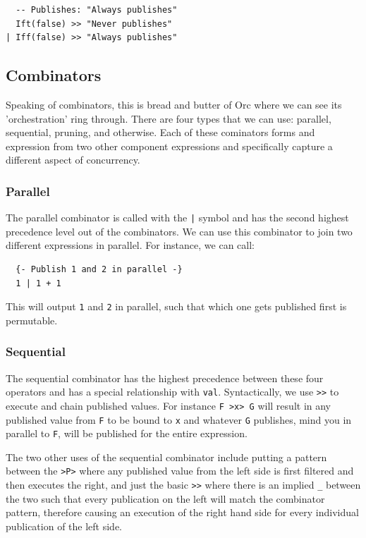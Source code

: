 \documentclass[12pt, letterpaper]{article}
\begin{document}
\begin{lstlisting}
  -- Publishes: "Always publishes"
  Ift(false) >> "Never publishes"
| Iff(false) >> "Always publishes"
\end{lstlisting}

\subsection{Combinators}

Speaking of combinators, this is bread and butter of Orc where we can see its 'orchestration' ring through.  There are four types that we can use: parallel, sequential, pruning, and otherwise.  Each of these cominators forms and expression from two other component expressions and specifically capture a different aspect of concurrency\cite{UserGuide}.

\subsubsection{Parallel}

The parallel combinator is called with the \texttt{|} symbol and has the second highest precedence level out of the combinators.  We can use this combinator to join two different expressions in parallel.  For instance, we can call:

\begin{lstlisting}
  {- Publish 1 and 2 in parallel -}
  1 | 1 + 1
\end{lstlisting}

This will output \texttt{1} and \texttt{2} in parallel, such that which one gets published first is permutable.

\subsubsection{Sequential}

The sequential combinator has the highest precedence between these four operators and has a special relationship with \texttt{val}.  Syntactically, we use \texttt{>>} to execute and chain published values.  For instance \texttt{F >x> G} will result in any published value from \texttt{F} to be bound to \texttt{x} and whatever \texttt{G} publishes, mind you in parallel to \texttt{F}, will be published for the entire expression.

The two other uses of the sequential combinator include putting a pattern between the \texttt{>P>} where any published value from the left side is first filtered and then executes the right, and just the basic \texttt{>>} where there is an implied \texttt{\_} between the two such that every publication on the left will match the combinator pattern, therefore causing an execution of the right hand side for every individual publication of the left side\cite{UserGuide}.
\end{document}
